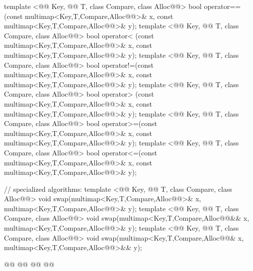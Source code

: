 \documentclass[american,twoside]{book}
\begin{document}
\begin{codeblock}
{  template <@@ Key, @@ T, class Compare, class Alloc@@>
    bool operator==(const multimap<Key,T,Compare,Alloc@@>& x,
                    const multimap<Key,T,Compare,Alloc@@>& y);
  template <@@ Key, @@ T, class Compare, class Alloc@@>
    bool operator< (const multimap<Key,T,Compare,Alloc@@>& x,
                    const multimap<Key,T,Compare,Alloc@@>& y);
  template <@@ Key, @@ T, class Compare, class Alloc@@>
    bool operator!=(const multimap<Key,T,Compare,Alloc@@>& x,
                    const multimap<Key,T,Compare,Alloc@@>& y);
  template <@@ Key, @@ T, class Compare, class Alloc@@>
    bool operator> (const multimap<Key,T,Compare,Alloc@@>& x,
                    const multimap<Key,T,Compare,Alloc@@>& y);
  template <@@ Key, @@ T, class Compare, class Alloc@@>
    bool operator>=(const multimap<Key,T,Compare,Alloc@@>& x,
                    const multimap<Key,T,Compare,Alloc@@>& y);
  template <@@ Key, @@ T, class Compare, class Alloc@@>
    bool operator<=(const multimap<Key,T,Compare,Alloc@@>& x,
                    const multimap<Key,T,Compare,Alloc@@>& y);

  // specialized algorithms:
  template <@@ Key, @@ T, class Compare, class Alloc@@>
    void swap(multimap<Key,T,Compare,Alloc@@>& x,
              multimap<Key,T,Compare,Alloc@@>& y);
  template <@@ Key, @@ T, class Compare, class Alloc@@>
    void swap(multimap<Key,T,Compare,Alloc@@&& x,
              multimap<Key,T,Compare,Alloc@@>& y);
  template <@@ Key, @@ T, class Compare, class Alloc@@>
    void swap(multimap<Key,T,Compare,Alloc@@& x,
              multimap<Key,T,Compare,Alloc@@>&& y);

  @@
    @@
      @@
        @@
}
\end{codeblock}%
\end{document}
